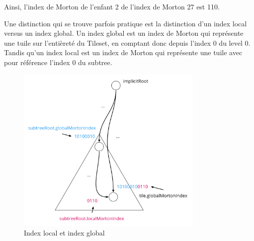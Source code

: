 Ainsi, l'index de Morton de l'enfant 2 de l'index de Morton 27 est 110.

\newpage
Une distinction qui se trouve parfois pratique est la distinction d'un index local versus un index global. Un index global est un index de Morton qui représente une tuile sur l'entièreté du Tileset, en comptant donc depuis l'index 0 du level 0. Tandis qu'un index local est un index de Morton qui représente une tuile avec pour référence l'index 0 du subtree.

\begin{figure}[H]
    \centering
    \includegraphics[width=0.8\textwidth]{assets/figures/global-to-local-morton.png}
    \caption{Index local et index global \cite{availability-gh}}
    \label{fig:xy-morton}
\end{figure}
